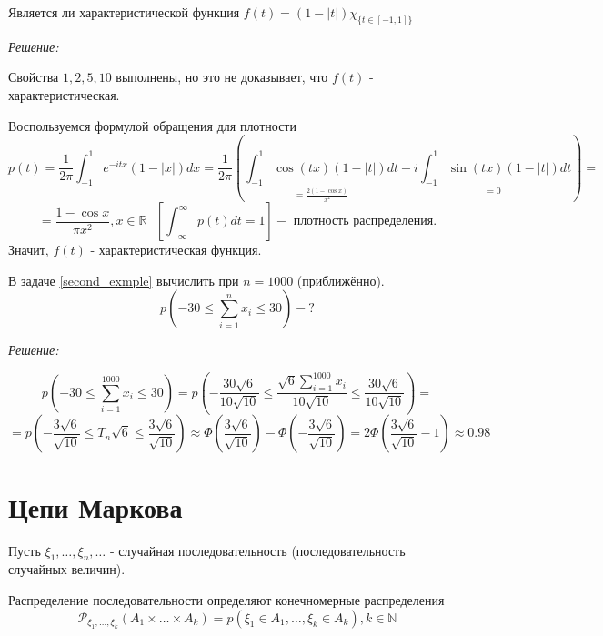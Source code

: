 \begin{exmp}
	Является ли характеристической функция $f(t) = (1 - |t|) \chi_{ \{ t \in [-1, 1] \} } $
	
	\textit{Решение:}
	
	Свойства $1,2,5,10$ выполнены, но это не доказывает, что $f(t)$ - характеристическая.
	
	Воспользуемся формулой обращения для плотности
	\[
	p(t) = \frac{1}{2 \pi} \int_{-1}^{1} e^{-itx} (1 - |x|) dx = \frac{1}{2 \pi} \left( \underset{=\frac{2(1 - \cos x)}{x^2}}{\int_{-1}^{1} \cos (tx) (1 - |t|) dt} - \underset{=0}{i \int_{-1}^{1} \sin (tx) (1 - |t|) dt} \right) =
	\]
	\[ = \frac{1 - \cos x}{\pi x^2}, x \in \mathbb{R} ~~~ \left[ \int_{-\infty}^{\infty} p(t) dt = 1 \right] - \text{ плотность распределения.} \]
	Значит, $f(t)$ - характеристическая функция.
\end{exmp}
\begin{exmp}
	В задаче \ref{second_exmple} вычислить при $n = 1000$ (приближённо).
	\[ p \left( -30 \le \sum\limits_{i=1}^{n} x_i \le 30 \right) - ? \]
	
	\textit{Решение:}
	
	\[
	p \left( -30 \le \sum\limits_{i=1}^{1000} x_i \le 30 \right) = p \left( - \frac{30 \sqrt{6}}{10 \sqrt{10}} \le \frac{\sqrt{6} \sum\limits_{i=1}^{1000} x_i}{10 \sqrt{10}} \le \frac{30 \sqrt{6}}{10 \sqrt{10}} \right) =
	\]
	\[
	= p \left( - \frac{3 \sqrt{6}}{\sqrt{10}} \le T_n \sqrt{6} \le \frac{3 \sqrt{6}}{\sqrt{10}} \right) \approx \Phi \left( \frac{3 \sqrt{6}}{\sqrt{10}} \right) - \Phi \left( - \frac{3 \sqrt{6}}{\sqrt{10}} \right) = 2 \Phi \left( \frac{3 \sqrt{6}}{\sqrt{10}} - 1  \right) \approx 0.98
	\]
\end{exmp}

\section{Цепи Маркова}

\noindent Пусть $\xi_1, \dots, \xi_n, \dots$ - случайная последовательность (последовательность случайных величин).
\begin{definition}
	Распределение последовательности определяют конечномерные распределения
	\[ \mathcal{P}_{\xi_1, \dots, \xi_k} (A_1 \times \dots \times A_k) = p(\xi_1 \in A_1, \dots, \xi_k \in A_k), k \in \mathbb{N} \]
\end{definition}

